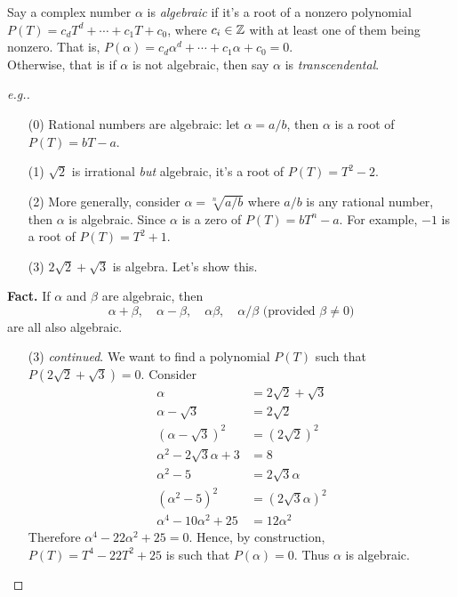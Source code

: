 
\begin{definition}
Say a complex number $\alpha$ is \emph{algebraic} if it's a root of a nonzero polynomial $P(T) = c_dT^d + \cdots + c_1T + c_0$, where $c_i \in \mathbb Z$ with at least one of them being nonzero. That is, $P(\alpha) = c_d\alpha^d + \cdots + c_1\alpha + c_0 = 0$.\\[0.5em]
Otherwise, that is if $\alpha$ is not algebraic, then say $\alpha$ is \emph{transcendental}.
\end{definition}
\begin{proof}[e.g.]\renewcommand{\qedsymbol}{}
\begin{itemize}
\item[(0)] Rational numbers are algebraic: let $\alpha = a/b$, then $\alpha$ is a root of $P(T) = bT-a$.
\end{itemize}
\begin{itemize}[leftmargin=4.4em]
\item[(1)] $\sqrt{2}$ is irrational \emph{but} algebraic, it's a root of $P(T) = T^2 - 2$.
\item[(2)] More generally, consider $\alpha = \sqrt[n]{a/b}$ where $a/b$ is any rational number, then $\alpha$ is algebraic. Since $\alpha$ is a zero of $P(T) = bT^n - a$. For example, $-1$ is a root of $P(T) = T^2 + 1$.
\item[(3)] $2\sqrt{2} + \sqrt{3}$ is algebra. Let's show this.
\end{itemize}
\vspace*{0.3em}
{\bf\large Fact.} If $\alpha$ and $\beta$ are algebraic, then 
\[\alpha + \beta,\quad \alpha - \beta,\quad \alpha\beta,\quad \alpha/\beta \text{ (provided $\beta \neq 0$)}\]
are all also algebraic.
\vspace*{0.3em}
\begin{itemize}[leftmargin=4.4em]
\item[(3)] \emph{continued}. We want to find a polynomial $P(T)$ such that $P(2\sqrt{2} + \sqrt{3}) = 0$. Consider
\begin{align*}
\alpha &= 2\sqrt{2} + \sqrt{3}\\[0.5em]
\alpha - \sqrt{3} &=  2\sqrt{2}\\[0.5em]
(\alpha - \sqrt{3})^2 &=  (2\sqrt{2})^2\\[0.5em]
\alpha^2 - 2\sqrt{3}\alpha + 3 &= 8\\[0.5em]
\alpha^2 - 5 &= 2\sqrt{3}\alpha\\[0.5em]
(\alpha^2 - 5)^2 &= (2\sqrt{3}\alpha)^2\\[0.5em]
\alpha^4 - 10\alpha^2 + 25 &= 12\alpha^2
\end{align*}
Therefore $\alpha^4 - 22\alpha^2 + 25 = 0$. Hence, by construction, $P(T) = T^4 - 22T^2 + 25$ is such that $P(\alpha) = 0$. Thus $\alpha$ is algebraic.
\end{itemize}
\vspace*{-\baselineskip}
\end{proof}

